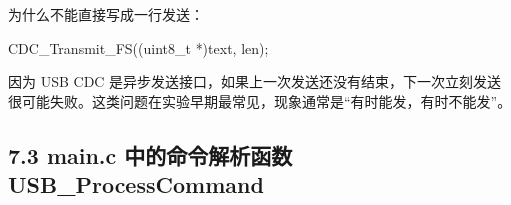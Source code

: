 \documentclass[
  chinese,
  UTF8,
  oneside,
  openany]{ctexbook}
\newenvironment{Shaded}{}{}
\newcommand{\DataTypeTok}[1]{\textcolor[rgb]{0.56,0.13,0.00}{#1}}
\newcommand{\NormalTok}[1]{#1}
\newcommand{\OperatorTok}[1]{\textcolor[rgb]{0.40,0.40,0.40}{#1}}
\begin{document}
为什么不能直接写成一行发送：

\begin{Shaded}
\begin{Highlighting}[]
\NormalTok{CDC\_Transmit\_FS}\OperatorTok{((}\DataTypeTok{uint8\_t} \OperatorTok{*)}\NormalTok{text}\OperatorTok{,}\NormalTok{ len}\OperatorTok{);}
\end{Highlighting}
\end{Shaded}

因为 USB CDC
是异步发送接口，如果上一次发送还没有结束，下一次立刻发送很可能失败。这类问题在实验早期最常见，现象通常是``有时能发，有时不能发''。

\subsection{7.3 main.c 中的命令解析函数
USB\_ProcessCommand}\label{main.c-ux4e2dux7684ux547dux4ee4ux89e3ux6790ux51fdux6570-usb_processcommand}
\end{document}
